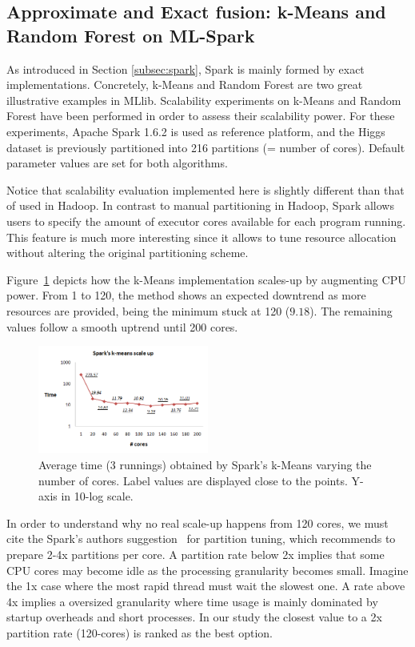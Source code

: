 \documentclass[3p,review]{elsarticle}
\begin{document}
\subsection{Approximate and Exact fusion: k-Means and Random Forest on ML-Spark}
\label{subsec:rfspark}

As introduced in Section \ref{subsec:spark}, Spark is mainly formed by exact implementations. Concretely, k-Means and Random Forest are two great illustrative examples in MLlib. Scalability experiments on k-Means and Random Forest have been performed in order to assess their scalability power. For these experiments, Apache Spark 1.6.2 is used as reference platform, and the Higgs dataset is previously partitioned into 216 partitions (= number of cores). Default parameter values are set for both algorithms.

Notice that scalability evaluation implemented here is slightly different than that of used in Hadoop. In contrast to manual partitioning in Hadoop, Spark allows users to specify the amount of executor cores available for each program running. This feature is much more interesting since it allows to tune resource allocation without altering the original partitioning scheme.

Figure~\ref{fig:kmeans-spark} depicts how the k-Means implementation scales-up by augmenting CPU power. From 1 to 120, the method shows an expected downtrend as more resources are provided, being the minimum stuck at 120 ($9.18$). The remaining values follow a smooth uptrend until 200 cores. 

\begin{figure}[!htp]
	\centering
	\includegraphics[width=0.5\textwidth]{kmeans-spark}
	\caption{Average time (3 runnings) obtained by Spark's k-Means varying the number of cores. Label values are displayed close to the points. Y-axis in 10-log scale.}
	\label{fig:kmeans-spark}
\end{figure}

In order to understand why no real scale-up happens from 120 cores, we must cite the Spark's authors suggestion~\cite{mllibguide} for partition tuning, which recommends to prepare 2-4x partitions per core. A partition rate below 2x implies that some CPU cores may become idle as the processing granularity becomes small. Imagine the 1x case where the most rapid thread must wait the slowest one. A rate above 4x implies a oversized granularity where time usage is mainly dominated by startup overheads and short processes. In our study the closest value to a 2x partition rate (120-cores) is ranked as the best option. 
\end{document}
